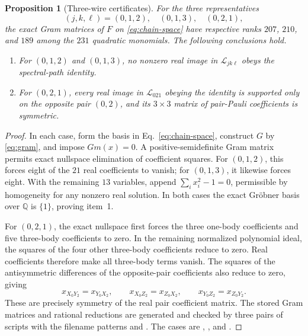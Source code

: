 \documentclass[11pt]{article}
\newtheorem{proposition}{Proposition}
\begin{document}
\begin{proposition}[Three-wire certificates]\label{prop:chain}
For the three representatives
\begin{equation}\label{eq:representatives}
(j,k,\ell)=(0,1,2),\quad(0,1,3),\quad(0,2,1),
\end{equation}
the exact Gram matrices of $F$ on \eqref{eq:chain-space} have respective
ranks $207$, $210$, and $189$ among the $231$ quadratic monomials.
The following conclusions hold.
\begin{enumerate}
\item For $(0,1,2)$ and $(0,1,3)$, no nonzero real image in
      $\mathcal L_{jk\ell}$ obeys the spectral-path identity.
\item For $(0,2,1)$, every real image in
      $\mathcal L_{021}$ obeying the identity is supported only on the
      opposite pair $(0,2)$, and its $3\times3$ matrix of pair-Pauli
      coefficients is symmetric.
\end{enumerate}
\end{proposition}

\begin{proof}
In each case, form the basis in Eq.~\eqref{eq:chain-space}, construct
$G$ by \eqref{eq:gram}, and impose $Gm(x)=0$.  A positive-semidefinite
Gram matrix permits exact nullspace elimination of coefficient squares.
For $(0,1,2)$, this forces eight of the $21$ real coefficients to vanish;
for $(0,1,3)$, it likewise forces eight.  With the remaining $13$
variables, append $\sum_i x_i^2-1=0$, permissible by homogeneity for
any nonzero real solution.  In both cases the exact Gr\"obner basis over
$\mathbb Q$ is $\{1\}$, proving item~1.

For $(0,2,1)$, the exact nullspace first forces the three one-body
coefficients and five three-body coefficients to zero.  In the remaining
normalized polynomial ideal, the squares of the four other three-body
coefficients reduce to zero.  Real coefficients therefore make all
three-body terms vanish.  The squares of the antisymmetric differences
of the opposite-pair coefficients also reduce to zero, giving
\begin{equation}\label{eq:symmetric}
x_{X_0Y_2}=x_{Y_0X_2},\qquad
x_{X_0Z_2}=x_{Z_0X_2},\qquad
x_{Y_0Z_2}=x_{Z_0Y_2}.
\end{equation}
These are precisely symmetry of the real pair coefficient matrix.
The stored Gram matrices and rational reductions are generated and
checked by three pairs of scripts with the filename patterns
 and
.
The cases are , , and
.
\end{proof}
\end{document}
